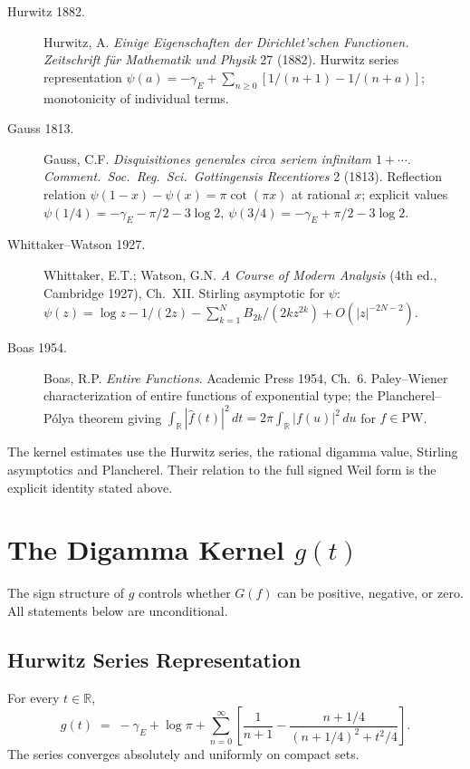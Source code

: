 \begin{description}
\item[Hurwitz 1882.] Hurwitz, A. \emph{Einige Eigenschaften der
Dirichlet'schen Functionen.} \emph{Zeitschrift f\"ur Mathematik und
Physik} 27 (1882). Hurwitz series representation
\(\psi(a)=-\gamma_{E}+\sum_{n\geq 0}[1/(n+1)-1/(n+a)]\); monotonicity of
individual terms.
\item[Gauss 1813.] Gauss, C.F. \emph{Disquisitiones generales circa
seriem infinitam \(1+\cdots\)}. \emph{Comment.~Soc.~Reg.~Sci.~Gottingensis
Recentiores} 2 (1813). Reflection relation
\(\psi(1-x)-\psi(x)=\pi\cot(\pi x)\) at rational \(x\); explicit values
\(\psi(1/4)=-\gamma_{E}-\pi/2-3\log 2\),
\(\psi(3/4)=-\gamma_{E}+\pi/2-3\log 2\).
\item[Whittaker--Watson 1927.] Whittaker, E.T.; Watson, G.N. \emph{A
Course of Modern Analysis} (4th ed., Cambridge 1927), Ch.~XII.
Stirling asymptotic for \(\psi\):
\(\psi(z)=\log z-1/(2z)-\sum_{k=1}^{N}B_{2k}/(2k z^{2k})+O(|z|^{-2N-2})\).
\item[Boas 1954.] Boas, R.P. \emph{Entire Functions}.
Academic Press 1954, Ch.~6. Paley--Wiener characterization of entire
functions of exponential type; the Plancherel--P\'olya theorem giving
\(\int_{\mathbb{R}}|\widehat{f}(t)|^{2}\,dt=2\pi\int_{\mathbb{R}}|f(u)|^{2}\,du\)
for \(f\in\mathrm{PW}\).
\end{description}

The kernel estimates use the Hurwitz series, the rational digamma
value, Stirling asymptotics and Plancherel. Their relation to the
full signed Weil form is the explicit identity stated above.

\section{The Digamma Kernel \(g(t)\)}
\label{v4-arith:w6-a:digamma-kernel}

The sign structure of \(g\) controls whether
\(G(f)\) can be positive, negative, or zero.
All statements below are unconditional.

\subsection{Hurwitz Series Representation}
\label{v4-arith:w6-a:digamma-kernel:hurwitz}

\begin{lemma}
\label{v4-arith:w6-a:lem:g-hurwitz}
For every \(t\in\mathbb{R}\),
\begin{equation}
\label{v4-arith:w6-a:eq:g-hurwitz}
g(t)\;=\;-\gamma_{E}+\log\pi+\sum_{n=0}^{\infty}\!\left[\frac{1}{n+1}-\frac{n+1/4}{(n+1/4)^{2}+t^{2}/4}\right].
\end{equation}
The series converges absolutely and uniformly on compact sets.
\end{lemma}

